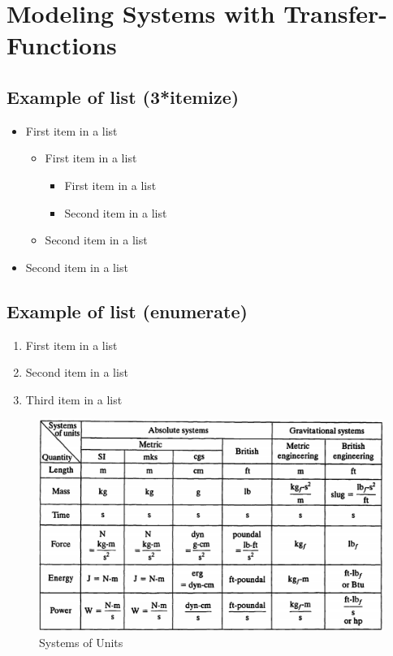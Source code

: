 \documentclass[paper=a4, fontsize=11pt]{scrartcl} %
\numberwithin{equation}{section} %
\numberwithin{figure}{section} %
\numberwithin{table}{section} %
\begin{document}

\section{Modeling Systems with Transfer-Functions}


\subsection{Example of list (3*itemize)}
\begin{itemize}
	\item First item in a list 
		\begin{itemize}
		\item First item in a list 
			\begin{itemize}
			\item First item in a list 
			\item Second item in a list 
			\end{itemize}
		\item Second item in a list 
		\end{itemize}
	\item Second item in a list 
\end{itemize}


\subsection{Example of list (enumerate)}
\begin{enumerate}
\item First item in a list 
\item Second item in a list 
\item Third item in a list
\end{enumerate}



\begin{figure}
  \includegraphics[width=40em]{System_of_Units.png}
  \caption{Systems of Units}
  \label{fig:boat1}
\end{figure}
\end{document}
